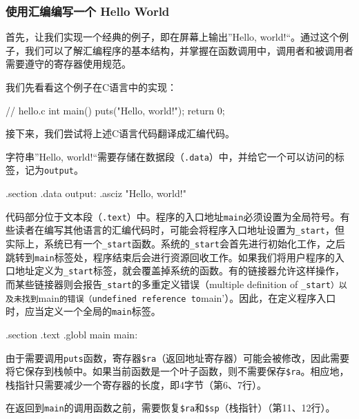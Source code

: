 \subsubsection{使用汇编编写一个 Hello World}\label{sec:02-software-preparation-007}

首先，让我们实现一个经典的例子，即在屏幕上输出''Hello, world!{\kern0pt}``。通过这个例子，我们可以了解汇编程序的基本结构，并掌握在函数调用中，调用者和被调用者需要遵守的寄存器使用规范。

我们先看看这个例子在C语言中的实现：

\begin{CodeBlock}[language=BookC]
// hello.c
int main() {
    puts("Hello, world!\n");
    return 0;
}
\end{CodeBlock}

接下来，我们尝试将上述C语言代码翻译成汇编代码。

字符串''Hello, world!{\kern0pt}``需要存储在数据段（\texttt{.data}）中，并给它一个可以访问的标签，记为\texttt{output}。

\begin{CodeBlock}[language=BookLoongArch]
.section .data
output: .asciz "Hello, world!\n"
\end{CodeBlock}

代码部分位于文本段（\texttt{.text}）中。程序的入口地址\texttt{main}必须设置为全局符号。有些读者在编写其他语言的汇编代码时，可能会将程序入口地址设置为\texttt{\_start}，但实际上，系统已有一个\texttt{\_start}函数。系统的\texttt{\_start}会首先进行初始化工作，之后跳转到\texttt{main}标签处，程序结束后会进行资源回收工作。如果我们将用户程序的入口地址定义为\texttt{\_start}标签，就会覆盖掉系统的函数。有的链接器允许这样操作，而某些链接器则会报告\texttt{\_start}的多重定义错误（multiple definition of \texttt{\_start\textquotesingle{}）以及未找到}main\texttt{的错误（undefined\ reference\ to}main'）。因此，在定义程序入口时，应当定义一个全局的\texttt{main}标签。

\begin{CodeBlock}[language=BookLoongArch]
.section .text
.globl main
main:
\end{CodeBlock}

由于需要调用\texttt{puts}函数，寄存器\texttt{\$ra}（返回地址寄存器）可能会被修改，因此需要将它保存到栈帧中。如果当前函数是一个叶子函数，则不需要保存\texttt{\$ra}。相应地，栈指针只需要减少一个寄存器的长度，即4字节（第6、7行）。

在返回到\texttt{main}的调用函数之前，需要恢复\texttt{\$ra}和\texttt{\$sp}（栈指针）（第11、12行）。

